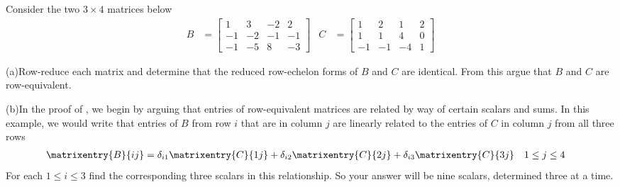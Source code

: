 Consider the two $3\times 4$ matrices below
%
\begin{align*}
B&=
\begin{bmatrix}
1 & 3 & -2 & 2 \\
-1 & -2 & -1 & -1 \\
-1 & -5 & 8 & -3
\end{bmatrix}
&
C&=
\begin{bmatrix}
1 & 2 & 1 & 2 \\
1 & 1 & 4 & 0 \\
-1 & -1 & -4 & 1
\end{bmatrix}
%
\end{align*}
%
\par
%
(a)\quad Row-reduce each matrix and determine that the reduced row-echelon forms of $B$ and $C$ are identical.  From this argue that $B$ and $C$ are row-equivalent.\par
%
(b)\quad In the proof of , we begin by arguing that entries of row-equivalent matrices are related by way of certain scalars and sums.  In this example, we would write that entries of $B$ from row $i$ that are in column $j$ are linearly related to the entries of $C$ in column $j$ from all three rows
%
\begin{align*}
\matrixentry{B}{ij}
&=
\delta_{i1}\matrixentry{C}{1j}+
\delta_{i2}\matrixentry{C}{2j}+
\delta_{i3}\matrixentry{C}{3j}
&
1&\leq j\leq 4
\end{align*}
%
For each $1\leq i\leq 3$ find the corresponding three scalars in this relationship.  So your answer will be nine scalars, determined three at a time.